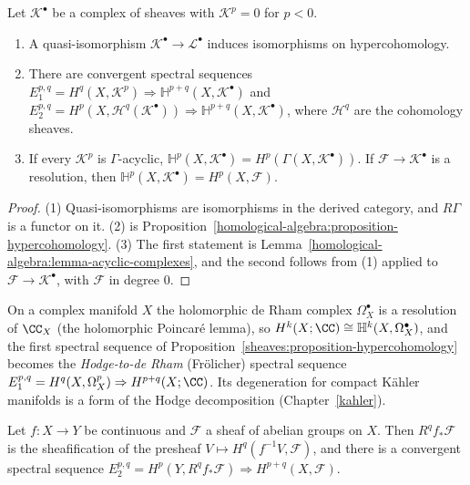 \begin{proposition}\label{sheaves:proposition-hypercohomology}
Let $\mathcal{K}^\bullet$ be a complex of sheaves with $\mathcal{K}^p = 0$ for $p < 0$.
\begin{enumerate}
\item A quasi-isomorphism $\mathcal{K}^\bullet \to \mathcal{L}^\bullet$ induces isomorphisms on hypercohomology.
\item There are convergent spectral sequences $E_1^{p,q} = H^q(X, \mathcal{K}^p) \Rightarrow \mathbb{H}^{p+q}(X, \mathcal{K}^\bullet)$ and
$E_2^{p,q} = H^p(X, \mathcal{H}^q(\mathcal{K}^\bullet)) \Rightarrow \mathbb{H}^{p+q}(X, \mathcal{K}^\bullet)$, where $\mathcal{H}^q$ are the cohomology sheaves.
\item If every $\mathcal{K}^p$ is $\Gamma$-acyclic, $\mathbb{H}^p(X, \mathcal{K}^\bullet) = H^p(\Gamma(X, \mathcal{K}^\bullet))$. If $\mathcal{F} \to \mathcal{K}^\bullet$ is a resolution, then
$\mathbb{H}^p(X, \mathcal{K}^\bullet) = H^p(X, \mathcal{F})$.
\end{enumerate}
\end{proposition}

\begin{proof}
(1) Quasi-isomorphisms are isomorphisms in the derived category, and $R\Gamma$ is a functor on it. (2) is Proposition~\ref{homological-algebra:proposition-hypercohomology}.
(3) The first statement is Lemma~\ref{homological-algebra:lemma-acyclic-complexes}, and the second follows from (1) applied to $\mathcal{F} \to \mathcal{K}^\bullet$, with $\mathcal{F}$ in degree $0$.
\end{proof}

\begin{remark}\label{sheaves:remark-holomorphic-de-rham}
On a complex manifold $X$ the holomorphic de Rham complex $\Omega^\bullet_X$ is a resolution of $\CC_X$ (the holomorphic Poincar\'e lemma), so $H^k(X; \CC) \cong \mathbb{H}^k(X, \Omega^\bullet_X)$,
and the first spectral sequence of Proposition~\ref{sheaves:proposition-hypercohomology} becomes the \emph{Hodge-to-de Rham} (Fr\"olicher) spectral sequence
$E_1^{p,q} = H^q(X, \Omega^p_X) \Rightarrow H^{p+q}(X; \CC)$. Its degeneration for compact K\"ahler manifolds is a form of the Hodge decomposition
(Chapter~\ref{kahler}).
\end{remark}

\begin{theorem}\label{sheaves:theorem-leray-spectral-sequence}
Let $f \colon X \to Y$ be continuous and $\mathcal{F}$ a sheaf of abelian groups on $X$. Then $R^qf_*\mathcal{F}$ is the sheafification of the presheaf $V \mapsto H^q(f^{-1}V, \mathcal{F})$,
and there is a convergent spectral sequence $E_2^{p,q} = H^p(Y, R^qf_*\mathcal{F}) \Rightarrow H^{p+q}(X, \mathcal{F})$.
\end{theorem}

